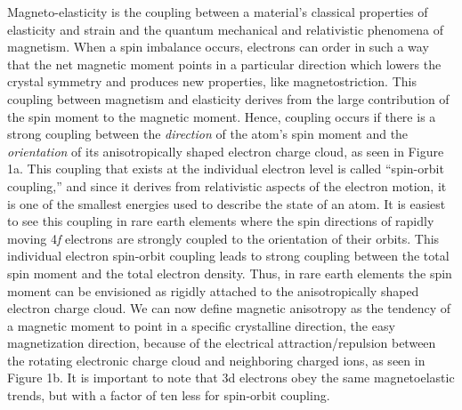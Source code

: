 Magneto-elasticity is the coupling between a material’s classical properties of elasticity and strain and the quantum mechanical and relativistic phenomena of magnetism.  When a spin imbalance occurs, electrons can order in such a way that the net magnetic moment points in a particular direction which lowers the crystal symmetry and produces new properties, like magnetostriction.\cite{Breu2008} This coupling between magnetism and elasticity derives from the large contribution of the spin moment to the magnetic moment.  Hence, coupling occurs if there is a strong coupling between the \textit{direction} of the atom’s spin moment and the \textit{orientation} of its anisotropically shaped electron charge cloud, as seen in Figure 1a.  This coupling that exists at the individual electron level is called “spin-orbit coupling,” and since it derives from relativistic aspects of the electron motion, it is one of the smallest energies used to describe the state of an atom.  It is easiest to see this coupling in rare earth elements where the spin directions of rapidly moving 4\textit{f} electrons are strongly coupled to the orientation of their orbits.  This individual electron spin-orbit coupling leads to strong coupling between the total spin moment and the total electron density.  Thus, in rare earth elements the spin moment can be envisioned as rigidly attached to the anisotropically shaped electron charge cloud.  We can now define magnetic anisotropy as the tendency of a magnetic moment to point in a specific crystalline direction, the easy magnetization direction, because of the electrical attraction/repulsion between the rotating electronic charge cloud and neighboring charged ions, as seen in Figure 1b.  It is important to note that 3d electrons obey the same magnetoelastic trends, but with a factor of ten less for spin-orbit coupling.\cite{Engdahl1999}

